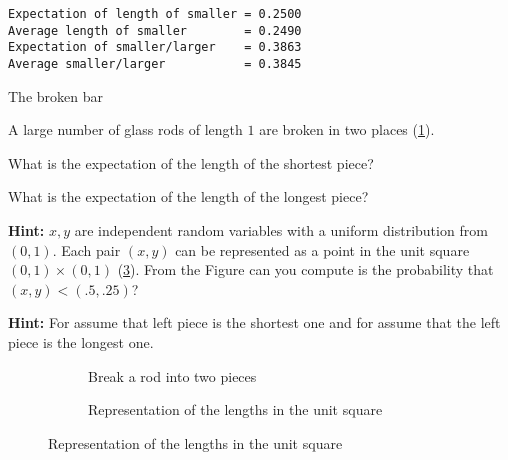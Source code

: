 \sml{}
\begin{verbatim}
Expectation of length of smaller = 0.2500
Average length of smaller        = 0.2490
Expectation of smaller/larger    = 0.3863
Average smaller/larger           = 0.3845
\end{verbatim}



\begin{prob}{The broken bar}

A large number of glass rods of length $1$ are broken in two places (\ref{f.break1}).

 What is the expectation of the length of the shortest piece?

 What is the expectation of the length of the longest piece?

\textbf{Hint:} $x,y$ are independent random variables with a uniform distribution from $(0,1)$. Each pair $(x,y)$ can be represented as a point in the unit square $(0,1)\times (0,1)$ (\ref{f.break2}). From the Figure can you compute is the probability that $(x,y) < (.5,.25)$?

\textbf{Hint:} For  assume that left piece is the shortest one and for  assume that the left piece is the longest one.
\begin{figure}[tb]
\begin{center}
\begin{subfigure}{.4\textwidth}
\caption{Break a rod into two pieces\hspace{6em}\mbox{}}\label{f.break1}
\end{subfigure}
\hspace{3em}
\begin{subfigure}{.4\textwidth}
\caption{Representation of the lengths in the unit square}\label{f.break2}
\end{subfigure}
\end{center}
\end{figure}
\end{prob}

